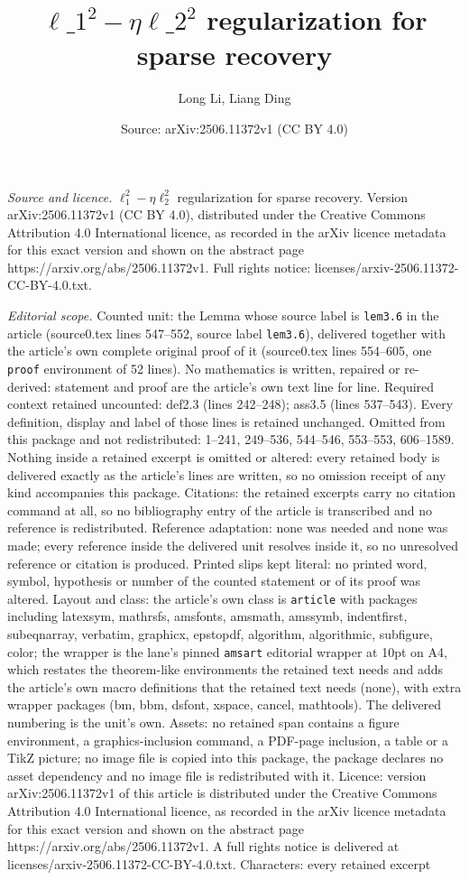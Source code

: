 \documentclass[10pt,a4paper]{amsart}
\title[$\ell\_{1}^{2}-\eta\ell\_{2}^{2}$ regularization for sparse re]{$\ell\_{1}^{2}-\eta\ell\_{2}^{2}$ regularization for sparse recovery}
\author{Long Li, Liang Ding}
\date{Source: arXiv:2506.11372v1 (CC BY 4.0)}
\begin{document}
\maketitle

\noindent\emph{Source and licence.} $\ell_{1}^{2}-\eta\ell_{2}^{2}$ regularization for sparse recovery. Version arXiv:2506.11372v1 (CC BY 4.0), distributed under the Creative Commons Attribution 4.0 International licence, as recorded in the arXiv licence metadata for this exact version and shown on the abstract page https://arxiv.org/abs/2506.11372v1. Full rights notice: licenses/arxiv-2506.11372-CC-BY-4.0.txt.\par\smallskip

\noindent\textit{Editorial scope.} Counted unit: the Lemma whose source label is \texttt{lem3.6} in the article (source0.tex lines 547--552, source label \texttt{lem3.6}), delivered together with the article's own complete original proof of it (source0.tex lines 554--605, one \texttt{proof} environment of 52 lines). No mathematics is written, repaired or re-derived: statement and proof are the article's own text line for line. Required context retained uncounted: def2.3 (lines 242--248); ass3.5 (lines 537--543). Every definition, display and label of those lines is retained unchanged. Omitted from this package and not redistributed: 1--241, 249--536, 544--546, 553--553, 606--1589. Nothing inside a retained excerpt is omitted or altered: every retained body is delivered exactly as the article's lines are written, so no omission receipt of any kind accompanies this package. Citations: the retained excerpts carry no citation command at all, so no bibliography entry of the article is transcribed and no reference is redistributed. Reference adaptation: none was needed and none was made; every reference inside the delivered unit resolves inside it, so no unresolved reference or citation is produced. Printed slips kept literal: no printed word, symbol, hypothesis or number of the counted statement or of its proof was altered. Layout and class: the article's own class is \texttt{article} with packages including latexsym, mathrsfs, amsfonts, amsmath, amssymb, indentfirst, subeqnarray, verbatim, graphicx, epstopdf, algorithm, algorithmic, subfigure, color; the wrapper is the lane's pinned \texttt{amsart} editorial wrapper at 10pt on A4, which restates the theorem-like environments the retained text needs and adds the article's own macro definitions that the retained text needs (none), with extra wrapper packages (bm, bbm, dsfont, xspace, cancel, mathtools). The delivered numbering is the unit's own. Assets: no retained span contains a figure environment, a graphics-inclusion command, a PDF-page inclusion, a table or a TikZ picture; no image file is copied into this package, the package declares no asset dependency and no image file is redistributed with it. Licence: version arXiv:2506.11372v1 of this article is distributed under the Creative Commons Attribution 4.0 International licence, as recorded in the arXiv licence metadata for this exact version and shown on the abstract page https://arxiv.org/abs/2506.11372v1. A full rights notice is delivered at licenses/arxiv-2506.11372-CC-BY-4.0.txt. Characters: every retained excerpt 
\end{document}
